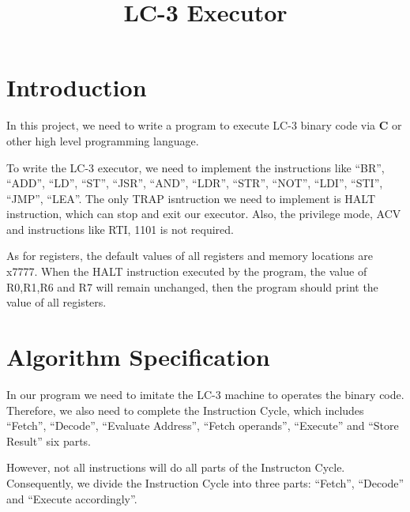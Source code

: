 \documentclass[twoside]{article}
\begin{document}
\begin{CJK*}{UTF8}{gbsn}
	\title{LC-3 Executor}
	\date{}
	\maketitle

	\section{Introduction}
	In this project, we need to write a program to execute LC-3 binary code via \textbf{C} or other high level programming language.
	
	To write the LC-3 executor, we need to implement the instructions like ``BR'', ``ADD'', ``LD'', ``ST'', ``JSR'', ``AND'', ``LDR'', ``STR'', ``NOT'', ``LDI'', ``STI'', ``JMP'', ``LEA''. The only TRAP isntruction we need to implement is HALT instruction, which can stop and exit our executor. Also, the privilege mode, ACV and instructions like RTI, 1101 is not required.
	
	As for registers, the default values of all registers and memory locations are x7777. When the HALT instruction executed by the program, the value of R0,R1,R6 and R7 will remain unchanged, then the program should print the value of all registers.
	
	
	
	\section{Algorithm Specification}
	
	In our program we need to imitate the LC-3 machine to operates the binary code. Therefore, we also need to complete the Instruction Cycle, which includes ``Fetch'', ``Decode'', ``Evaluate Address'', ``Fetch operands'', ``Execute'' and ``Store Result'' six parts.
	
	However, not all instructions will do all parts of the Instructon Cycle. Consequently, we divide the Instruction Cycle into three parts: ``Fetch'', ``Decode'' and ``Execute accordingly''.
	

\end{CJK*}
\end{document}
